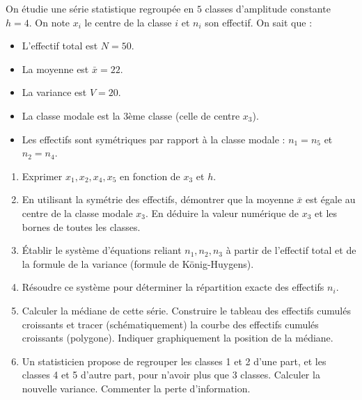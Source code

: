 \documentclass[11pt]{article}
\begin{document}
\begin{exercice}
On étudie une série statistique regroupée en $5$ classes d'amplitude constante $h = 4$. On note $x_i$ le centre de la classe $i$ et $n_i$ son effectif. On sait que :
\begin{itemize}
    \item L'effectif total est $N = 50$.
    \item La moyenne est $\bar{x} = 22$.
    \item La variance est $V = 20$.
    \item La classe modale est la 3ème classe (celle de centre $x_3$).
    \item Les effectifs sont symétriques par rapport à la classe modale : $n_1 = n_5$ et $n_2 = n_4$.
\end{itemize}

\begin{enumerate}
    \item Exprimer $x_1, x_2, x_4, x_5$ en fonction de $x_3$ et $h$.
    \item En utilisant la symétrie des effectifs, démontrer que la moyenne $\bar{x}$ est égale au centre de la classe modale $x_3$. En déduire la valeur numérique de $x_3$ et les bornes de toutes les classes.
    \item Établir le système d'équations reliant $n_1, n_2, n_3$ à partir de l'effectif total et de la formule de la variance (formule de König-Huygens).
    \item Résoudre ce système pour déterminer la répartition exacte des effectifs $n_i$.
    \item Calculer la médiane de cette série. Construire le tableau des effectifs cumulés croissants et tracer (schématiquement) la courbe des effectifs cumulés croissants (polygone). Indiquer graphiquement la position de la médiane.
    \item Un statisticien propose de regrouper les classes 1 et 2 d'une part, et les classes 4 et 5 d'autre part, pour n'avoir plus que 3 classes. Calculer la nouvelle variance. Commenter la perte d'information.
\end{enumerate}
\end{exercice}
\end{document}
